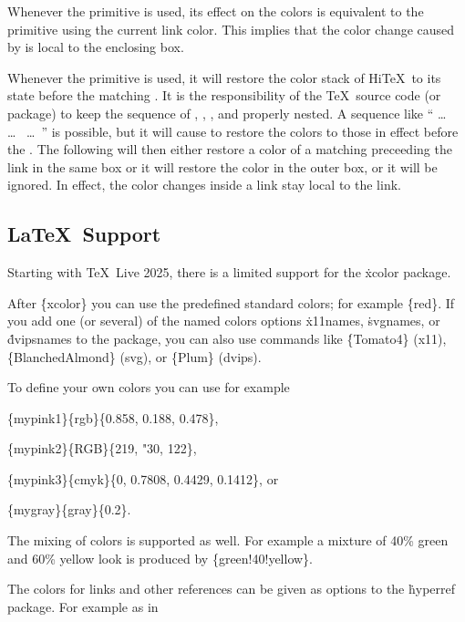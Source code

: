 Whenever the  primitive is used, its effect on the
colors is equivalent to the  primitive using the current
link color. This implies that the color change caused by 
is local to the enclosing box.

Whenever the  primitive is used, it will restore
the color stack of Hi\TeX\ to its state before the matching .
It is the responsibility of the \TeX\ source code (or package) to keep the
sequence of  , ,
, and  properly nested.
A sequence like  `` \dots\ 
 \dots\  \dots\ '' is possible,
but it will cause  to restore the colors to those
in effect before the .
The following  will then either restore
a color of a matching  preceeding
the link in the same box or it will restore the
color in the outer box, or it will be ignored.
In effect, the color changes inside a link stay local to the link.

\subsection{\LaTeX\ Support}
Starting with \TeX\ Live 2025, there is a limited support for the \.{xcolor}
package.

After \.{\{xcolor\}} you can use the predefined standard colors;
for example \.{\{red\}}. If you add one (or several) of the named colors
options \.{x11names}, \.{svgnames}, or \.{dvipsnames} to the package,
you can also use commands like
\.{\{Tomato4\}} (x11),
\.{\{BlanchedAlmond\}} (svg), or
\.{\{Plum\}} (dvips).


To define your own colors you can use for example

\.{\{mypink1\}\{rgb\}\{0.858, 0.188, 0.478\}},

\.{\{mypink2\}\{RGB\}\{219, "30, 122\}},

\.{\{mypink3\}\{cmyk\}\{0, 0.7808, 0.4429, 0.1412\}}, or

\.{\{mygray\}\{gray\}\{0.2\}}.

The mixing of colors is supported as well. For example a
mixture of 40\% green and 60\% yellow look is produced by
\.{\{green!40!yellow\}}.

The colors for links and other references can be given as options
to the \.{hyperref} package. For example as in

